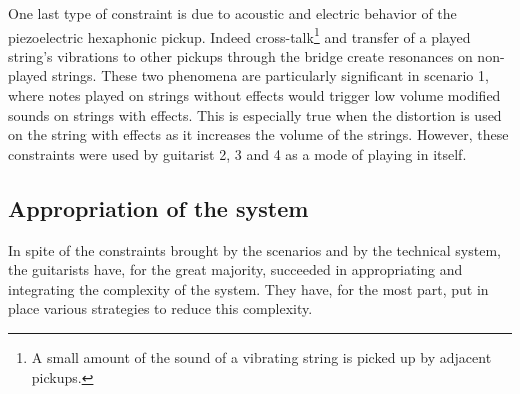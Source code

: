 \documentclass{article}
\begin{document}
One last type of constraint is due to acoustic and electric behavior of the piezoelectric hexaphonic pickup. Indeed cross-talk\footnote{A small amount of the sound of a vibrating string is picked up by adjacent pickups.} and transfer of a played string's vibrations to other pickups through the bridge create resonances on non-played strings. These two phenomena are particularly significant in scenario 1, where notes played on strings without effects would trigger low volume modified sounds on strings with effects. This is especially true when the distortion is used on the string with effects as it increases the volume of the strings.
However, these constraints were used by guitarist 2, 3 and 4 as a mode of playing in itself. 




\subsection{Appropriation of the system}

In spite of the constraints brought by the scenarios and by the technical system, the guitarists have, for the great majority, succeeded in appropriating and integrating the complexity of the system. They have, for the most part, put in place various strategies to reduce this complexity.
\end{document}
